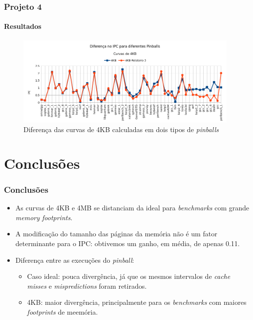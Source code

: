 \documentclass[10pt]{beamer}
\begin{document}
\begin{frame}
\frametitle{Projeto 4}
\framesubtitle{Resultados}

\begin{figure}
\includegraphics[width=0.98\textwidth]{images/4KB_pinballs}
\caption{Diferença das curvas de 4KB calculadas em dois tipos de
\textit{pinballs}}
\end{figure}

\end{frame}


\section{Conclusões}

\begin{frame}
\frametitle{Conclusões}

\begin{itemize}

\item As curvas de 4KB e 4MB se distanciam da ideal para \textit{benchmarks} com
grande \textit{memory footprints}.

\vspace{12pt}

\item A modificação do tamanho das páginas da memória não é um fator
determinante para o IPC: obtivemos um ganho, em média, de apenas 0.11.

\vspace{12pt}

\item Diferença entre as execuções do \textit{pinball}:	
\begin{itemize} 
	\item Caso ideal: pouca divergência, já que os mesmos intervalos de
	\textit{cache misses} e \textit{mispredictions} foram retirados.

	\item 4KB: maior divergência, principalmente para os \textit{benchmarks} com
	maiores \textit{footprints} de meemória.
\end{itemize} 

 
\end{itemize}

\end{frame}
\end{document}
